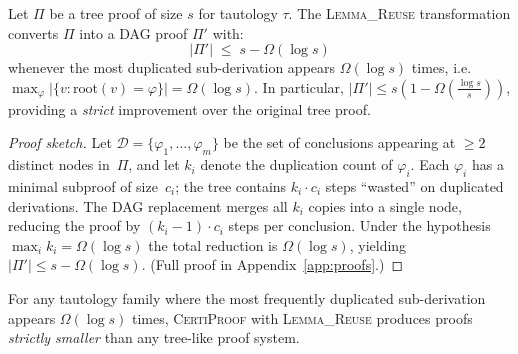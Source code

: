\documentclass[acmtocl,review,anonymous]{acmart}
\newcommand{\CP}{\textsc{CertiProof}}
\begin{document}
\begin{theorem}
  \label{thm:proof-size}
  Let $\Pi$ be a tree proof of size $s$ for tautology $\tau$.
  The   \textsc{Lemma\_Reuse} transformation converts $\Pi$ into a
  DAG proof $\Pi'$ with:
  \begin{equation}
    |\Pi'| \;\leq\; s - \Omega(\log s)
  \end{equation}
  whenever the most duplicated sub-derivation appears
  $\Omega(\log s)$ times, i.e.\
  $\max_{\varphi} |\{v : \mathrm{root}(v) = \varphi\}| = \Omega(\log s)$.
  In particular, $|\Pi'| \leq s(1 - \Omega(\tfrac{\log s}{s}))$,
  providing a \emph{strict} improvement over the original tree proof.
\end{theorem}
\begin{proof}[Proof sketch]
  Let $\mathcal{D} = \{\varphi_1, \ldots, \varphi_m\}$ be the set of
  conclusions appearing at $\geq 2$ distinct nodes in~$\Pi$, and let
  $k_i$ denote the duplication count of $\varphi_i$.  Each
  $\varphi_i$ has a minimal subproof of size~$c_i$; the tree contains
  $k_i \cdot c_i$ steps ``wasted'' on duplicated derivations.
  The DAG replacement merges all $k_i$ copies into a single node,
  reducing the proof by $(k_i-1) \cdot c_i$ steps per conclusion.
  Under the hypothesis
  $\max_i k_i = \Omega(\log s)$ the total reduction is
  $\Omega(\log s)$, yielding
  $|\Pi'| \leq s - \Omega(\log s)$.
  (Full proof in Appendix~\ref{app:proofs}.)
\end{proof}

\begin{corollary}
  For any tautology family where the most frequently duplicated
  sub-derivation appears $\Omega(\log s)$ times, \CP{} with
  \textsc{Lemma\_Reuse} produces proofs \emph{strictly smaller} than
  any tree-like proof system.
\end{corollary}
\end{document}
